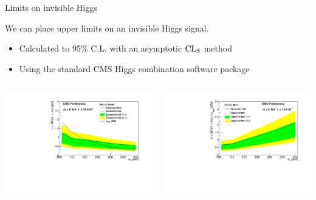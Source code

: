 \documentclass[8pt]{beamer}
\begin{document}
\begin{frame}{Limits on invisible Higgs}
 
We can place upper limits on an invisible Higgs signal.  
\begin{itemize}
 \item Calculated to 95\% C.L. with an asymptotic ${\rm CL}_{\rm S}$ method
 \item Using the standard CMS Higgs combination software package 
\end{itemize}
 
\begin{columns}
 
\begin{block}
 
\centering
\includegraphics[width=\linewidth]{img/XSLimit.pdf} 

\end{block}

\begin{block}
 
\centering
\includegraphics[width=\linewidth]{img/xsiLimit.pdf} 


\end{block}
\end{columns}
\end{frame}
\end{document}
